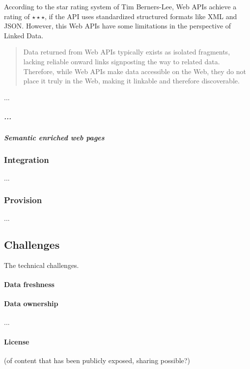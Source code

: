 \documentclass{article}
\begin{document}
According to the star rating system of Tim Berners-Lee, Web APIs achieve a rating of $\star\star\star$, if the API uses standardized structured formats like XML and JSON. However, this Web APIs have some limitations in the perspective of Linked Data. \begin{quote}Data returned from Web APIs typically exists as isolated fragments, lacking reliable onward links signposting the way to related data. Therefore, while Web APIs make data accessible on the Web, they do not place it truly in the Web, making it linkable and therefore discoverable. \cite{heath_linked_2011} \end{quote} 

...

\subparagraph{...}

\subparagraph{Semantic enriched web pages}

\subsubsection{Integration}
\label{technical-architecture-challenges:proposal:integration}
...

\subsubsection{Provision}
\label{technical-architecture-challenges:proposal:provision}
...

\subsection{Challenges}
\label{technical-architecture-challenges:challenges}

The technical challenges. 

\paragraph{Data freshness}
\label{technical-architecture-challenges:challenges:data-freshness}

\paragraph{Data ownership}
\label{technical-architecture-challenges:challenges:data-ownership}

...

\paragraph{License} (of content that has been publicly exposed, sharing possible?)
\label{technical-architecture-challenges:challenges:license}
\end{document}
